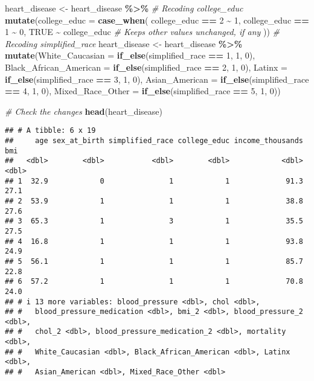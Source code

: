\documentclass[
]{article}
\newenvironment{Shaded}{\begin{snugshade}}{\end{snugshade}}
\newcommand{\AttributeTok}[1]{\textcolor[rgb]{0.13,0.29,0.53}{#1}}
\newcommand{\CommentTok}[1]{\textcolor[rgb]{0.56,0.35,0.01}{\textit{#1}}}
\newcommand{\ConstantTok}[1]{\textcolor[rgb]{0.56,0.35,0.01}{#1}}
\newcommand{\DecValTok}[1]{\textcolor[rgb]{0.00,0.00,0.81}{#1}}
\newcommand{\FunctionTok}[1]{\textcolor[rgb]{0.13,0.29,0.53}{\textbf{#1}}}
\newcommand{\NormalTok}[1]{#1}
\newcommand{\OtherTok}[1]{\textcolor[rgb]{0.56,0.35,0.01}{#1}}
\newcommand{\SpecialCharTok}[1]{\textcolor[rgb]{0.81,0.36,0.00}{\textbf{#1}}}
\begin{document}
\begin{Shaded}
\begin{Highlighting}[]
\NormalTok{heart\_disease }\OtherTok{\textless{}{-}}\NormalTok{ heart\_disease }\SpecialCharTok{\%\textgreater{}\%}
  \CommentTok{\# Recoding college\_educ}
  \FunctionTok{mutate}\NormalTok{(}\AttributeTok{college\_educ =} \FunctionTok{case\_when}\NormalTok{(}
\NormalTok{    college\_educ }\SpecialCharTok{==} \DecValTok{2} \SpecialCharTok{\textasciitilde{}} \DecValTok{1}\NormalTok{,}
\NormalTok{    college\_educ }\SpecialCharTok{==} \DecValTok{1} \SpecialCharTok{\textasciitilde{}} \DecValTok{0}\NormalTok{,}
    \ConstantTok{TRUE} \SpecialCharTok{\textasciitilde{}}\NormalTok{ college\_educ  }\CommentTok{\# Keeps other values unchanged, if any}
\NormalTok{  )) }
  \CommentTok{\# Recoding simplified\_race}
\NormalTok{  heart\_disease }\OtherTok{\textless{}{-}}\NormalTok{ heart\_disease }\SpecialCharTok{\%\textgreater{}\%}
  \FunctionTok{mutate}\NormalTok{(}\AttributeTok{White\_Caucasian =} \FunctionTok{if\_else}\NormalTok{(simplified\_race }\SpecialCharTok{==} \DecValTok{1}\NormalTok{, }\DecValTok{1}\NormalTok{, }\DecValTok{0}\NormalTok{),}
         \AttributeTok{Black\_African\_American =} \FunctionTok{if\_else}\NormalTok{(simplified\_race }\SpecialCharTok{==} \DecValTok{2}\NormalTok{, }\DecValTok{1}\NormalTok{, }\DecValTok{0}\NormalTok{),}
         \AttributeTok{Latinx =} \FunctionTok{if\_else}\NormalTok{(simplified\_race }\SpecialCharTok{==} \DecValTok{3}\NormalTok{, }\DecValTok{1}\NormalTok{, }\DecValTok{0}\NormalTok{),}
         \AttributeTok{Asian\_American =} \FunctionTok{if\_else}\NormalTok{(simplified\_race }\SpecialCharTok{==} \DecValTok{4}\NormalTok{, }\DecValTok{1}\NormalTok{, }\DecValTok{0}\NormalTok{),}
         \AttributeTok{Mixed\_Race\_Other =} \FunctionTok{if\_else}\NormalTok{(simplified\_race }\SpecialCharTok{==} \DecValTok{5}\NormalTok{, }\DecValTok{1}\NormalTok{, }\DecValTok{0}\NormalTok{))}

\CommentTok{\# Check the changes}
\FunctionTok{head}\NormalTok{(heart\_disease)}
\end{Highlighting}
\end{Shaded}

\begin{verbatim}
## # A tibble: 6 x 19
##     age sex_at_birth simplified_race college_educ income_thousands   bmi
##   <dbl>        <dbl>           <dbl>        <dbl>            <dbl> <dbl>
## 1  32.9            0               1            1             91.3  27.1
## 2  53.9            1               1            1             38.8  27.6
## 3  65.3            1               3            1             35.5  27.5
## 4  16.8            1               1            1             93.8  24.9
## 5  56.1            1               1            1             85.7  22.8
## 6  57.2            1               1            1             70.8  24.0
## # i 13 more variables: blood_pressure <dbl>, chol <dbl>,
## #   blood_pressure_medication <dbl>, bmi_2 <dbl>, blood_pressure_2 <dbl>,
## #   chol_2 <dbl>, blood_pressure_medication_2 <dbl>, mortality <dbl>,
## #   White_Caucasian <dbl>, Black_African_American <dbl>, Latinx <dbl>,
## #   Asian_American <dbl>, Mixed_Race_Other <dbl>
\end{verbatim}
\end{document}
